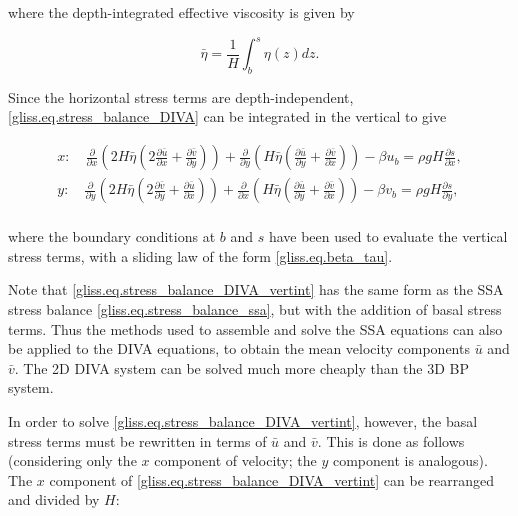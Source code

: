 {\noindent
where the depth-integrated effective viscosity is given by

\begin{equation}
  \label{gliss.eq.effective_viscosity_vertint}
  \bar{\eta} = \frac{1}{H}\int_{b}^{s}{\eta(z)dz}.
\end{equation}

\noindent
Since the horizontal stress terms are depth-independent,
\eqref{gliss.eq.stress_balance_DIVA} can be integrated in the vertical to give

\begin{equation}
  \label{gliss.eq.stress_balance_DIVA_vertint}
  \begin{split}
    x: \quad \frac{\partial }{\partial x}\left( 2H \bar{\eta} \left(2\frac{\partial \bar{u}}{\partial x} + \frac{\partial \bar{v}}{\partial y} \right) \right) 
           + \frac{\partial }{\partial y}\left(  H \bar{\eta} \left( \frac{\partial \bar{u}}{\partial y} + \frac{\partial \bar{v}}{\partial x} \right) \right) 
           - \beta u_b
           = \rho gH \frac{\partial s}{\partial x}, \\
    y: \quad \frac{\partial }{\partial y}\left( 2H \bar{\eta} \left(2\frac{\partial \bar{v}}{\partial y} + \frac{\partial \bar{u}}{\partial x} \right) \right) 
           + \frac{\partial }{\partial x}\left(  H \bar{\eta} \left( \frac{\partial \bar{u}}{\partial y} + \frac{\partial \bar{v}}{\partial x} \right) \right) 
           - \beta v_b
           = \rho gH \frac{\partial s}{\partial y},  \\
  \end{split}
\end{equation}

\noindent
where the boundary conditions at $b$ and $s$ have been used to evaluate the vertical stress terms,
with a sliding law of the form \eqref{gliss.eq.beta_tau}.

Note that \eqref{gliss.eq.stress_balance_DIVA_vertint} has the same form as the SSA
stress balance \eqref{gliss.eq.stress_balance_ssa}, but with the addition of basal stress terms.
Thus the methods used to assemble and solve the SSA equations can also be applied
to the DIVA equations, to obtain the mean velocity components $\bar{u}$ and $\bar{v}$.
The 2D DIVA system can be solved much more cheaply than the 3D BP system.

In order to solve \eqref{gliss.eq.stress_balance_DIVA_vertint}, however, the basal stress terms must be rewritten
in terms of $\bar{u}$ and $\bar{v}$. This is done as follows (considering only the $x$ component
of velocity; the $y$ component is analogous).
The $x$ component of \eqref{gliss.eq.stress_balance_DIVA_vertint} can be rearranged and
divided by $H$:

}
